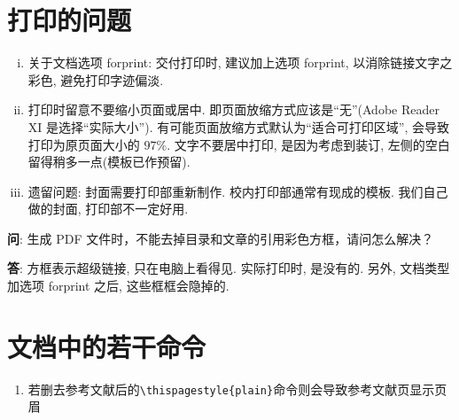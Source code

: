 

\section{打印的问题}
\begin{enumerate}[i)]
    \item  关于文档选项 forprint: 交付打印时, 建议加上选项 forprint, 以消除链接文字之彩色, 避免打印字迹偏淡.
    \item  打印时留意不要缩小页面或居中. 即页面放缩方式应该是``无''(Adobe Reader XI 是选择``实际大小'').
          有可能页面放缩方式默认为``适合可打印区域'', 会导致打印为原页面大小的 $97\%$.
          文字不要居中打印, 是因为考虑到装订, 左侧的空白留得稍多一点(模板已作预留). \the\baselineskip
    \item  遗留问题: 封面需要打印部重新制作.  校内打印部通常有现成的模板.
          我们自己做的封面, 打印部不一定好用.
\end{enumerate}

\textbf{问}: {\kaishu 生成 PDF 文件时，不能去掉目录和文章的引用彩色方框，请问怎么解决？\the\baselineskip} \the\baselineskip

\textbf{答}: {\kaishu 方框表示超级链接, 只在电脑上看得见. 实际打印时, 是没有的. 另外, 文档类型加选项 forprint 之后, 这些框框会隐掉的. }

\section{文档中的若干命令 \the\baselineskip}
\begin{enumerate}
    \item 若删去参考文献后的\verb|\thispagestyle{plain}|命令则会导致参考文献页显示页眉 \the\baselineskip
\end{enumerate}
